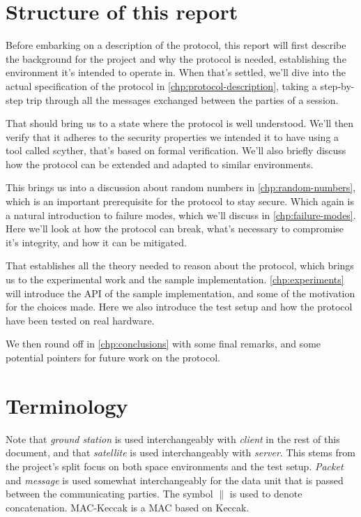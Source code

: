 \section{Structure of this report}\label{sec:structure}

Before embarking on a description of the protocol, this report will first describe the background for the project and why the protocol is needed, establishing the environment it's intended to operate in. When that's settled, we'll dive into the actual specification of the protocol in \autoref{chp:protocol-description}, taking a step-by-step trip through all the messages exchanged between the parties of a session.

That should bring us to a state where the protocol is well understood. We'll then verify that it adheres to the security properties we intended it to have using a tool called scyther, that's based on formal verification. We'll also briefly discuss how the protocol can be extended and adapted to similar environments.

This brings us into a discussion about random numbers in \autoref{chp:random-numbers}, which is an important prerequisite for the protocol to stay secure. Which again is a natural introduction to failure modes, which we'll discuss in \autoref{chp:failure-modes}. Here we'll look at how the protocol can break, what's necessary to compromise it's integrity, and how it can be mitigated.

That establishes all the theory needed to reason about the protocol, which brings us to the experimental work and the sample implementation. \autoref{chp:experiments} will introduce the API of the sample implementation, and some of the motivation for the choices made. Here we also introduce the test setup and how the protocol have been tested on real hardware.

We then round off in \autoref{chp:conclusions} with some final remarks, and some potential pointers for future work on the protocol.


\section{Terminology}\label{sec:terminology}

Note that \emph{ground station} is used interchangeably with \emph{client} in the rest of this document, and that \emph{satellite} is used interchangeably with \emph{server}. This stems from the project's split focus on both space environments and the test setup. \emph{Packet} and \emph{message} is used somewhat interchangeably for the data unit that is passed between the communicating parties. The symbol $\|$ is used to denote concatenation. MAC-Keccak is a MAC based on Keccak.
